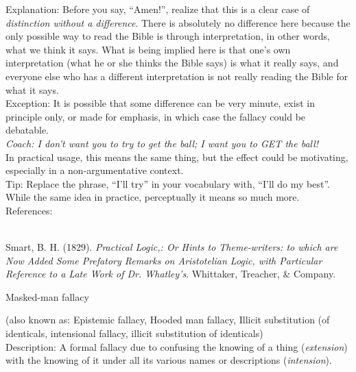 \documentclass[a4paper,12pt,single,pdftex]{scrartcl}
\begin{document}
{    
      Explanation: Before you say, “Amen!”, realize that this is a clear case of {\it distinction without a difference}.  There is absolutely no difference here because the only possible way to read the Bible is through interpretation, in other words, what we think it says.  What is being implied here is that one's own interpretation (what he or she thinks the Bible says) is what it really says, and everyone else who has a different interpretation is not really reading the Bible for what it says.
    \\

    
      Exception: It is possible that some difference can be very minute, exist in principle only, or made for emphasis, in which case the fallacy could be debatable.
    \\

    
      {\em Coach:  I don’t want you to try to get the ball; I want you to GET the ball!}
    \\

    
      In practical usage, this means the same thing, but the effect could be motivating, especially in a non-argumentative context.
    \\

    
      Tip: Replace the phrase, “I’ll try” in your vocabulary with, “I’ll do my best”.  While the same idea in practice, perceptually it means so much more.
    \\

    References:

    
      
        
      \\

      
        
          Smart, B. H. (1829). {\it Practical Logic,: Or Hints to Theme-writers: to which are Now Added Some Prefatory Remarks on Aristotelian Logic, with Particular Reference to a Late Work of Dr. Whatley’s}. Whittaker, Treacher, \& Company.
        
      
    
  }


Masked-man fallacy
    
      (also known as: Epistemic fallacy, Hooded man fallacy, Illicit substitution (of identicals, intensional fallacy, illicit substitution of identicals)
    \\

  
    Description: A formal fallacy due to confusing the knowing of a thing ({\it extension}) with the knowing of it under all its various names or descriptions ({\it intension}).
\end{document}

